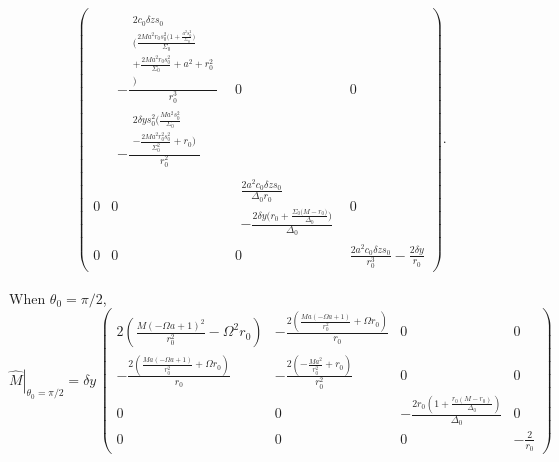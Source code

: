 \documentclass[english]{article}
\begin{document}
\begin{align*}
\begin{pmatrix}
 & \begin{gathered}-\frac{\begin{gathered}2c_{0}\delta zs_{0}\\
\biggl(\frac{2Ma^{2}r_{0}s^{2}_{0}\biggl(1+\frac{a^{2}s^{2}_{0}}{\Sigma_{0}}\biggr)}{\Sigma_{0}}\\
+\frac{2Ma^{2}r_{0}s^{2}_{0}}{\Sigma_{0}}+a^{2}+r^{2}_{0}\\
\biggr)
\end{gathered}
}{r^{3}_{0}}\\
-\frac{\begin{gathered}2\delta ys^{2}_{0}\biggl(\frac{Ma^{2}s^{2}_{0}}{\Sigma_{0}}\\
-\frac{2Ma^{2}r^{2}_{0}s^{2}_{0}}{\Sigma^{2}_{0}}+r_{0}\biggr)
\end{gathered}
}{r^{2}_{0}}
\end{gathered}
 & 0 & 0\\
0 & 0 & \begin{gathered}\frac{2a^{2}c_{0}\delta zs_{0}}{\Delta_{0}r_{0}}\\
-\frac{2\delta y\biggl(r_{0}+\frac{\Sigma_{0}\biggl(M-r_{0}\biggr)}{\Delta_{0}}\biggr)}{\Delta_{0}}
\end{gathered}
 & 0\\
0 & 0 & 0 & \frac{2a^{2}c_{0}\delta zs_{0}}{r^{3}_{0}}-\frac{2\delta y}{r_{0}}
\end{pmatrix}.
\end{align*}

When $\theta_{0}=\pi/2$, 
\[
\left.\hat{M}\right|_{\theta_{0}=\pi/2}=\delta y\,\begin{pmatrix}2\left(\frac{M\left(-\Omega a+1\right)^{2}}{r^{2}_{0}}-\Omega^{2}r_{0}\right) & -\frac{2\left(\frac{Ma\left(-\Omega a+1\right)}{r^{2}_{0}}+\Omega r_{0}\right)}{r_{0}} & 0 & 0\\
-\frac{2\left(\frac{Ma\left(-\Omega a+1\right)}{r^{2}_{0}}+\Omega r_{0}\right)}{r_{0}} & -\frac{2\left(-\frac{Ma^{2}}{r^{2}_{0}}+r_{0}\right)}{r^{2}_{0}} & 0 & 0\\
0 & 0 & -\frac{2r_{0}\left(1+\frac{r_{0}\left(M-r_{0}\right)}{\Delta_{0}}\right)}{\Delta_{0}} & 0\\
0 & 0 & 0 & -\frac{2}{r_{0}}
\end{pmatrix}
\]
\end{document}
